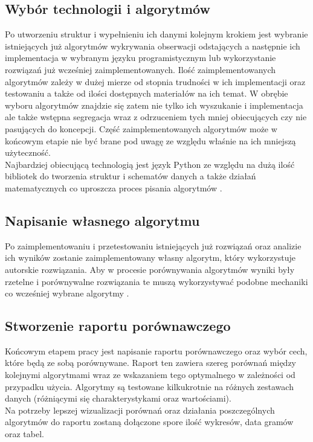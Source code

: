 \documentclass[eng,printmode]{mgr}
\begin{document}
\subsection{Wybór technologii i algorytmów}
Po utworzeniu struktur i wypełnieniu ich danymi kolejnym krokiem jest wybranie istniejących już algorytmów wykrywania obserwacji odstających \cite{outliers-basic} a następnie ich implementacja w wybranym języku programistycznym lub wykorzystanie rozwiązań już wcześniej zaimplementowanych. Ilość zaimplementowanych algorytmów zależy w dużej mierze od stopnia trudności w ich implementacji oraz testowaniu a także od ilości dostępnych materiałów na ich temat. W obrębie wyboru algorytmów znajdzie się zatem nie tylko ich wyszukanie i implementacja ale także wstępna segregacja wraz z odrzuceniem tych mniej obiecujących czy nie pasujących do koncepcji. Część zaimplementowanych algorytmów może w końcowym etapie nie być brane pod uwagę ze względu właśnie na ich mniejszą użyteczność. \\
Najbardziej obiecującą technologią jest język Python \cite{python} ze względu na dużą ilość bibliotek do tworzenia struktur i schematów danych \cite{pandas} a także działań matematycznych co uproszcza proces pisania algorytmów \cite{numpy}.

\subsection{Napisanie własnego algorytmu}
Po zaimplementowaniu i przetestowaniu istniejących już rozwiązań oraz analizie ich wyników zostanie zaimplementowany własny algorytm, który wykorzystuje autorskie rozwiązania. Aby w procesie porównywania algorytmów wyniki były rzetelne i porównywalne rozwiązania te muszą wykorzystywać podobne mechaniki co wcześniej wybrane algorytmy \cite{isolation-forest}\cite{novelty}. 

\subsection{Stworzenie raportu porównawczego}
Końcowym etapem pracy jest napisanie raportu porównawczego oraz wybór cech, które będą ze sobą porównywane. Raport ten zawiera szereg porównań między kolejnymi algorytmami wraz ze wskazaniem tego optymalnego w zależności od przypadku użycia. Algorytmy są testowane kilkukrotnie na różnych zestawach danych (różniącymi się charakterystykami oraz wartościami). \\
Na potrzeby lepszej wizualizacji porównań oraz działania poszczególnych algorytmów do raportu zostaną dołączone spore ilość wykresów, data gramów oraz tabel.
\end{document}
